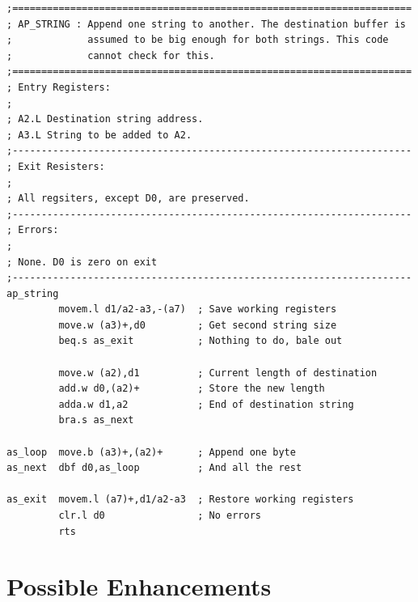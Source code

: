\begin{lstlisting}[firstnumber=last,caption={QlToday\_pe\_utilities\_asm}]
;=====================================================================
; AP_STRING : Append one string to another. The destination buffer is
;             assumed to be big enough for both strings. This code
;             cannot check for this.
;=====================================================================
; Entry Registers:
;
; A2.L Destination string address.
; A3.L String to be added to A2.
;---------------------------------------------------------------------
; Exit Resisters:
;
; All regsiters, except D0, are preserved.
;---------------------------------------------------------------------
; Errors:
;
; None. D0 is zero on exit
;---------------------------------------------------------------------
ap_string
         movem.l d1/a2-a3,-(a7)  ; Save working registers
         move.w (a3)+,d0         ; Get second string size
         beq.s as_exit           ; Nothing to do, bale out

         move.w (a2),d1          ; Current length of destination
         add.w d0,(a2)+          ; Store the new length
         adda.w d1,a2            ; End of destination string
         bra.s as_next

as_loop  move.b (a3)+,(a2)+      ; Append one byte
as_next  dbf d0,as_loop          ; And all the rest

as_exit  movem.l (a7)+,d1/a2-a3  ; Restore working registers
         clr.l d0                ; No errors
         rts
\end{lstlisting}

\section{Possible Enhancements}

